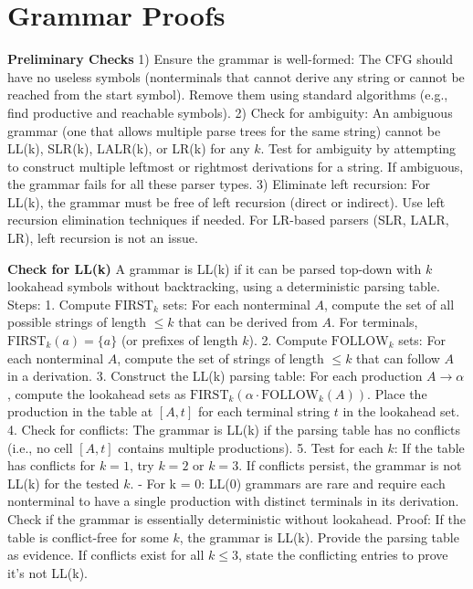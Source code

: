 
\section{Grammar Proofs}

\textbf{Preliminary Checks}
   1) Ensure the grammar is well-formed: The CFG should have no useless symbols (nonterminals that cannot derive any string or cannot be reached from the start symbol). Remove them using standard algorithms (e.g., find productive and reachable symbols).
   2) Check for ambiguity: An ambiguous grammar (one that allows multiple parse trees for the same string) cannot be LL(k), SLR(k), LALR(k), or LR(k) for any \( k \). Test for ambiguity by attempting to construct multiple leftmost or rightmost derivations for a string. If ambiguous, the grammar fails for all these parser types.
   3) Eliminate left recursion: For LL(k), the grammar must be free of left recursion (direct or indirect). Use left recursion elimination techniques if needed. For LR-based parsers (SLR, LALR, LR), left recursion is not an issue.

\textbf{Check for LL(k)}
   A grammar is LL(k) if it can be parsed top-down with \( k \) lookahead symbols without backtracking, using a deterministic parsing table.
   Steps:
     1. Compute $\text{FIRST}_k$ sets: For each nonterminal \( A \), compute the set of all possible strings of length \( \leq k \) that can be derived from \( A \). For terminals, \( \text{FIRST}_k(a) = \{a\} \) (or prefixes of length \( k \)).
     2. Compute $\text{FOLLOW}_k$ sets: For each nonterminal \( A \), compute the set of strings of length \( \leq k \) that can follow \( A \) in a derivation.
     3. Construct the LL(k) parsing table: For each production \( A \to \alpha \), compute the lookahead sets as \( \text{FIRST}_k(\alpha \cdot \text{FOLLOW}_k(A)) \). Place the production in the table at \( [A, t] \) for each terminal string \( t \) in the lookahead set.
     4. Check for conflicts: The grammar is LL(k) if the parsing table has no conflicts (i.e., no cell \( [A, t] \) contains multiple productions).
     5. Test for each \( k \): If the table has conflicts for \( k = 1 \), try \( k = 2 \) or \( k = 3 \). If conflicts persist, the grammar is not LL(k) for the tested \( k \).
     - For k = 0: LL(0) grammars are rare and require each nonterminal to have a single production with distinct terminals in its derivation. Check if the grammar is essentially deterministic without lookahead.
   Proof: If the table is conflict-free for some \( k \), the grammar is LL(k). Provide the parsing table as evidence. If conflicts exist for all \( k \leq 3 \), state the conflicting entries to prove it’s not LL(k).

